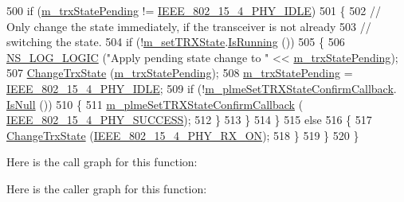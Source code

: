 \begin{DoxyCode}
500       \textcolor{keywordflow}{if} (\hyperlink{classns3_1_1LrWpanPhy_a84647014f5242767e3358a6a851c81a7}{m\_trxStatePending} != \hyperlink{group__lr-wpan_gga6494269d13d45c511a07b7ccbb1de754af3994414efcd2fac7e312ecb9b3ebd70}{IEEE\_802\_15\_4\_PHY\_IDLE})
501         \{
502           \textcolor{comment}{// Only change the state immediately, if the transceiver is not already}
503           \textcolor{comment}{// switching the state.}
504           \textcolor{keywordflow}{if} (!\hyperlink{classns3_1_1LrWpanPhy_a0b82e7f96d0225c83489cf3dfb6058ce}{m\_setTRXState}.\hyperlink{classns3_1_1EventId_aabf8476d1a080c199ea0c6aa9ccea372}{IsRunning} ())
505             \{
506               \hyperlink{group__logging_ga88acd260151caf2db9c0fc84997f45ce}{NS\_LOG\_LOGIC} (\textcolor{stringliteral}{"Apply pending state change to "} << 
      \hyperlink{classns3_1_1LrWpanPhy_a84647014f5242767e3358a6a851c81a7}{m\_trxStatePending});
507               \hyperlink{classns3_1_1LrWpanPhy_a149987679698c2878d941fac1238c41a}{ChangeTrxState} (\hyperlink{classns3_1_1LrWpanPhy_a84647014f5242767e3358a6a851c81a7}{m\_trxStatePending});
508               \hyperlink{classns3_1_1LrWpanPhy_a84647014f5242767e3358a6a851c81a7}{m\_trxStatePending} = \hyperlink{group__lr-wpan_gga6494269d13d45c511a07b7ccbb1de754af3994414efcd2fac7e312ecb9b3ebd70}{IEEE\_802\_15\_4\_PHY\_IDLE};
509               \textcolor{keywordflow}{if} (!\hyperlink{classns3_1_1LrWpanPhy_ab3fed0e994f9e51e765c704f1a7b666f}{m\_plmeSetTRXStateConfirmCallback}.
      \hyperlink{classns3_1_1Callback_aa8e27826badbf37f84763f36f70d9b54}{IsNull} ())
510                 \{
511                   \hyperlink{classns3_1_1LrWpanPhy_ab3fed0e994f9e51e765c704f1a7b666f}{m\_plmeSetTRXStateConfirmCallback} (
      \hyperlink{group__lr-wpan_gga6494269d13d45c511a07b7ccbb1de754a2a81d56261f039e08cf2dd91de10b618}{IEEE\_802\_15\_4\_PHY\_SUCCESS});
512                 \}
513             \}
514         \}
515       \textcolor{keywordflow}{else}
516         \{
517           \hyperlink{classns3_1_1LrWpanPhy_a149987679698c2878d941fac1238c41a}{ChangeTrxState} (\hyperlink{group__lr-wpan_gga6494269d13d45c511a07b7ccbb1de754a9480f69fea1a74b7961ed74d6b3e2f9e}{IEEE\_802\_15\_4\_PHY\_RX\_ON});
518         \}
519     \}
520 \}
\end{DoxyCode}


Here is the call graph for this function\+:




Here is the caller graph for this function\+:


